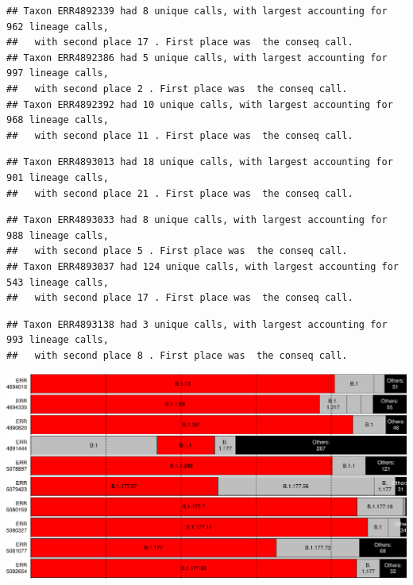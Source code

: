 \documentclass[
]{article}
\begin{document}
\begin{verbatim}
## Taxon ERR4892339 had 8 unique calls, with largest accounting for 962 lineage calls, 
##   with second place 17 . First place was  the conseq call.
## Taxon ERR4892386 had 5 unique calls, with largest accounting for 997 lineage calls, 
##   with second place 2 . First place was  the conseq call.
## Taxon ERR4892392 had 10 unique calls, with largest accounting for 968 lineage calls, 
##   with second place 11 . First place was  the conseq call.
\end{verbatim}

\begin{verbatim}
## Taxon ERR4893013 had 18 unique calls, with largest accounting for 901 lineage calls, 
##   with second place 21 . First place was  the conseq call.
\end{verbatim}

\begin{verbatim}
## Taxon ERR4893033 had 8 unique calls, with largest accounting for 988 lineage calls, 
##   with second place 5 . First place was  the conseq call.
## Taxon ERR4893037 had 124 unique calls, with largest accounting for 543 lineage calls, 
##   with second place 17 . First place was  the conseq call.
\end{verbatim}

\begin{verbatim}
## Taxon ERR4893138 had 3 unique calls, with largest accounting for 993 lineage calls, 
##   with second place 8 . First place was  the conseq call.
\end{verbatim}

\includegraphics{pangolin_results_report_files/figure-latex/pareto-1.pdf}
\end{document}

